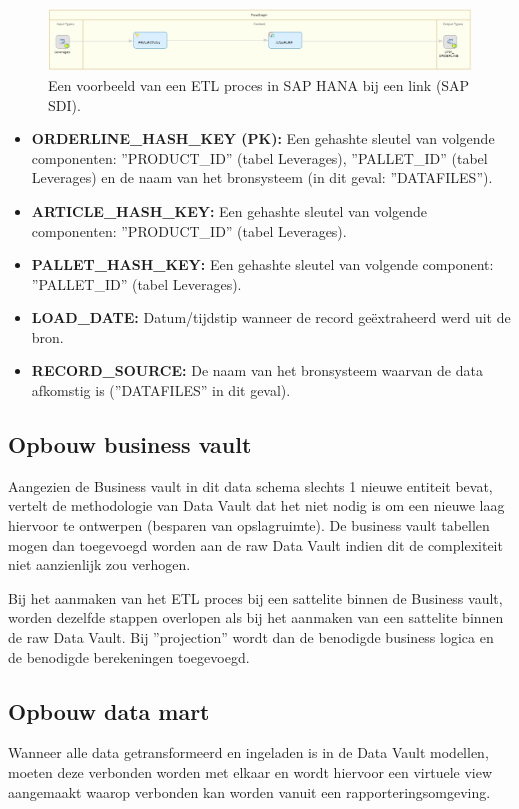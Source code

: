 \begin{figure}[h]
	\centering
	\includegraphics[scale=0.45]{../images/DV_FG_link.png}
	\caption{Een voorbeeld van een ETL proces in SAP HANA bij een link (SAP SDI).}
	\label{fig:etllink}
\end{figure}

\begin{itemize}
	\item \textbf{ORDERLINE\_HASH\_KEY (PK):} Een gehashte sleutel van volgende componenten: ''PRODUCT\_ID'' (tabel Leverages), ''PALLET\_ID'' (tabel Leverages)  en de naam van het bronsysteem (in dit geval: ''DATAFILES'').
	\item \textbf{ARTICLE\_HASH\_KEY:} Een gehashte sleutel van volgende componenten: ''PRODUCT\_ID'' (tabel Leverages).
	\item \textbf{PALLET\_HASH\_KEY:} Een gehashte sleutel van volgende component: ''PALLET\_ID'' (tabel Leverages).
	\item \textbf{LOAD\_DATE:} Datum/tijdstip wanneer de record geëxtraheerd werd uit de bron.
	\item \textbf{RECORD\_SOURCE:} De naam van het bronsysteem waarvan de data afkomstig is (''DATAFILES'' in dit geval).
\end{itemize}

\subsection{Opbouw business vault}
Aangezien de Business vault in dit data schema slechts 1 nieuwe entiteit bevat, vertelt de methodologie van Data Vault dat het niet nodig is om een nieuwe laag hiervoor te ontwerpen (besparen van opslagruimte). De business vault tabellen mogen dan toegevoegd worden aan de raw Data Vault indien dit de complexiteit niet aanzienlijk zou verhogen.

Bij het aanmaken van het ETL proces bij een sattelite binnen de Business vault, worden dezelfde stappen overlopen als bij het aanmaken van een sattelite binnen de raw Data Vault. Bij ''projection'' wordt dan de benodigde business logica en de benodigde berekeningen toegevoegd.

\subsection{Opbouw data mart}
Wanneer alle data getransformeerd en ingeladen is in de Data Vault modellen, moeten deze verbonden worden met elkaar en wordt hiervoor een virtuele view aangemaakt waarop verbonden kan worden vanuit een rapporteringsomgeving.

